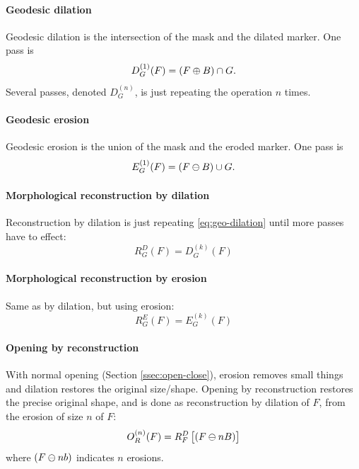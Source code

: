 \paragraph{Geodesic dilation}
Geodesic dilation is the intersection of the mask and the dilated marker. One pass is
\begin{equation}\label{eq:geo-dilation}
    D_G^{(1)}(F) = (F \oplus B) \cap G.
\end{equation}
Several passes, denoted $D_G^{(n)}$, is just repeating the operation $n$ times.

\paragraph{Geodesic erosion}
Geodesic erosion is the union of the mask and the eroded marker. One pass is
\begin{equation}\label{eq:geo-erosion}
    E_G^{(1)}(F) = (F \ominus B) \cup G.
\end{equation}

\paragraph{Morphological reconstruction by dilation}
Reconstruction by dilation is just repeating \eqref{eq:geo-dilation} until more passes have to effect:
\begin{equation}
    R_G^D(F) = D_G^{(k)}(F)
\end{equation}

\paragraph{Morphological reconstruction by erosion}
Same as by dilation, but using erosion:
\begin{equation}
    R_G^E(F) = E_G^{(k)}(F)
\end{equation}

\paragraph{Opening by reconstruction}
With normal opening (Section \ref{ssec:open-close}), erosion removes small things and dilation restores the original size/shape. Opening by reconstruction restores the precise original shape, and is done as reconstruction by dilation of $F$, from the erosion of size $n$ of $F$:
\begin{equation}
    O_R^{(n)}(F) = R_F^D \left[ (F \ominus nB) \right]
\end{equation}
where $(F \ominus nb)$ indicates $n$ erosions.

